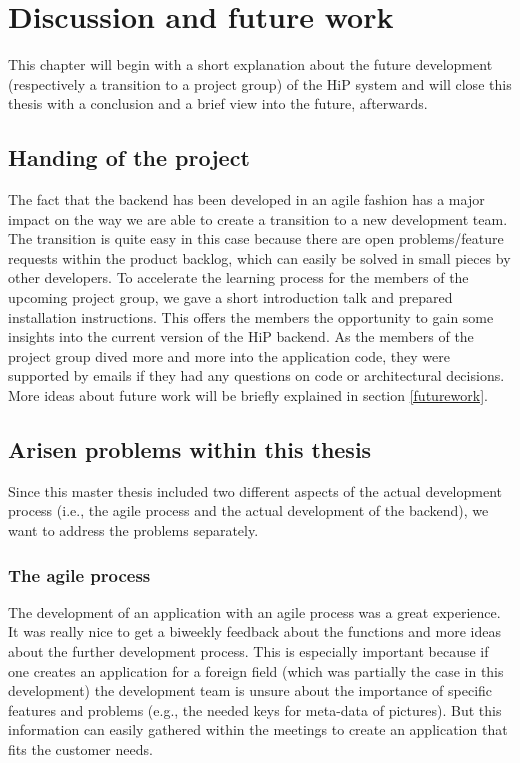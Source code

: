 \chapter[Discussion and future work]{Discussion and future work}
\label{discussion}
This chapter will begin with a short explanation about the future development (respectively a transition to a project group) of the \ac{HiP} system and will close this thesis with a conclusion and a brief view into the future, afterwards. 

\section{Handing of the project}
The fact that the backend has been developed in an agile fashion has a major impact on the way we are able to create a transition to a new development team. The transition is quite easy in this case because there are open problems/feature requests within the product backlog, which can easily be solved in small pieces by other developers. To accelerate the learning process for the members of the upcoming project group, we gave a short introduction talk and prepared installation instructions. This offers the members the opportunity to gain some insights into the current version of the \ac{HiP} backend. As the members of the project group dived more and more into the application code, they were supported by emails if they had any questions on code or architectural decisions. More ideas about future work will be briefly explained in section \ref{futurework}. 

\section{Arisen problems within this thesis}
Since this master thesis included two different aspects of the actual development process (i.e., the agile process and the actual development of the backend), we want to address the problems separately. 

\subsection{The agile process}
The development  of an application with an agile process was a great experience. It was really nice to get a biweekly feedback about the functions and more ideas about the further development process. This is especially important because if one creates an application for a foreign field (which was partially the case in this development) the development team is unsure about the importance of specific features and problems (e.g., the needed keys for meta-data of pictures). But this information can easily gathered within the meetings to create an application that fits the customer needs. 

